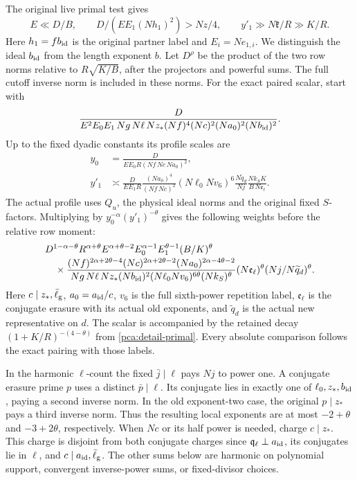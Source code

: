 The original live primal test gives
\begin{equation}\label{pca:detail-primal}
 E\ll D/B,\qquad
 D/(E E_1(Nh_1)^2)>Nz/4,\qquad y'_1\gg N\mathfrak k/R\gg K/R .
\end{equation}
Here \(h_1=f b_{\rm id}\) is the original partner label and
\(E_i=Ne_{1,i}\). We distinguish the ideal \(b_{\rm id}\) from
the length exponent \(b\). Let \(D^\rho\) be the product of the
two row norms relative to \(R\sqrt{K/B}\), after the projectors
and powerful sums. The full cutoff inverse norm is included
in these norms. For the exact paired scalar, start with
\[
 \frac{D}{E^2E_0E_1\,Ng\,N\ell\,Nz_*
          (Nf)^4(Nc)^2(Na_0)^2(Nb_{\rm id})^2}.
\]
Up to the fixed dyadic constants its profile scales are
\[
 \begin{aligned}
 y_0&=\frac{D}{EE_0 R(Nf\,Nc\,Na_0)^2},\\
 y'_1&\asymp
 \frac{D}{EE_1 R}\frac{(Na_0)^4}{(Nf\,Nc)^2}
 (N\ell_0 Nv_6)^6\frac{N\widetilde q_d}{Nj}
             \frac{Nk_S K}{B\,N\mathfrak e_\ell}.
 \end{aligned}
\]
The actual profile uses \(Q_u\), the physical ideal norms
and the original fixed \(S\)-factors.
Multiplying by \(y_0^{-\alpha}(y'_1)^{-\theta}\) gives the
following weights before the relative row moment:
\begin{equation}\label{pca:detail-scalar}
 \begin{aligned}
 &D^{1-\alpha-\theta}R^{\alpha+\theta}E^{\alpha+\theta-2}
   E_0^{\alpha-1} E_1^{\theta-1}(B/K)^\theta\\[-2pt]
 &\quad{}\times
 \frac{(Nf)^{2\alpha+2\theta-4}(Nc)^{2\alpha+2\theta-2}
       (Na_0)^{2\alpha-4\theta-2}}
      {Ng\,N\ell\,Nz_*(Nb_{\rm id})^2
        (N\ell_0 Nv_6)^{6\theta}(Nk_S)^\theta}
 (N\mathfrak e_\ell)^\theta
       (Nj/N\widetilde q_d)^\theta .
 \end{aligned}
\end{equation}
Here \(c\mid z_*,\bar\ell_{\rm g}\), \(a_0=a_{\rm id}/c\),
\(v_6\) is the full sixth-power repetition label,
\(\mathfrak e_\ell\) is the conjugate erasure with its actual
old exponents, and \(\widetilde q_d\) is the actual new representative
on \(d\). The scalar is accompanied by the retained decay
\((1+K/R)^{-(4-\theta)}\) from \eqref{pca:detail-primal}.
Every absolute comparison follows the exact pairing with those labels.

In the harmonic \(\ell\)-count the fixed \(\bar j\mid\ell\)
pays \(Nj\) to power one. A conjugate erasure prime \(p\) uses a
distinct \(\bar p\mid\ell\). Its conjugate lies in exactly one of
\(\ell_0,z_*,b_{\rm id}\), paying a second inverse norm. In the
old exponent-two case, the original \(p\mid z_*\) pays a third
inverse norm. Thus the resulting local exponents are at most
\(-2+\theta\) and \(-3+2\theta\), respectively. When \(Nc\)
or its half power is needed, charge \(c\mid z_*\). This charge
is disjoint from both conjugate charges since
\(\mathfrak q_\ell\perp a_{\rm id}\), its conjugates lie in
\(\ell\), and \(c\mid a_{\rm id},\bar\ell_{\rm g}\).
The other sums below are harmonic on polynomial support,
convergent inverse-power sums, or fixed-divisor choices.

